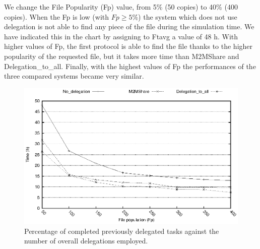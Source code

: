 We change the File Popularity (Fp) value, from 5\% (50 copies) to 40\% (400 copies). When the Fp is low (with $Fp \geq 5\%$) the system which does not use delegation is not able to find any piece of the file during the simulation time. We have indicated this in the chart by assigning to Ftavg a value of 48 h. With higher values of Fp, the first protocol is able to find the file thanks to the higher popularity of the requested file, but it takes more time than M2MShare and Delegation\_to\_all. Finally, with the highest values of Fp the performances of the three compared systems became very similar. 
\begin{figure}[ht]
  \begin{center}
    \includegraphics[scale=0.5]{grafici/tempiVFDiversaPop.eps}
    \caption{Percentage of completed previously delegated tasks against the number of overall delegations employed.}
    \label{graficoPopVariabile}
  \end{center}
\end{figure}


\newpage
